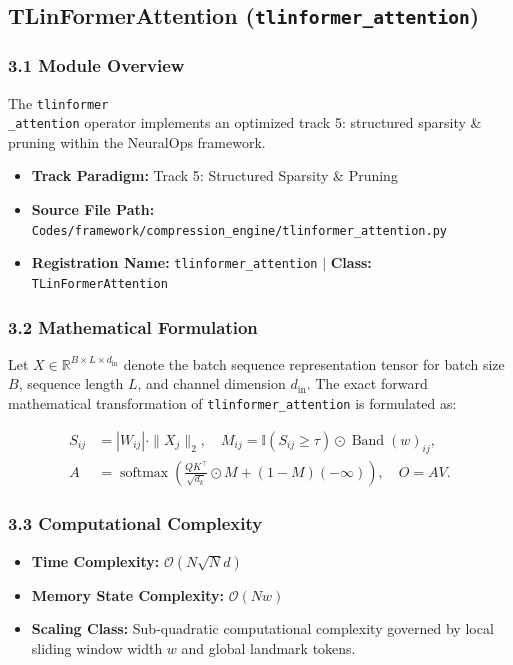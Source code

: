 \subsection{TLinFormerAttention (\texttt{tlinformer\_attention})}
\label{sec:app_module_tlinformer_attention}

\subsubsection*{3.1 Module Overview}
The \texttt{tlinformer\\_attention} operator implements an optimized track 5: structured sparsity \& pruning within the NeuralOps framework.
\begin{itemize}
    \item \textbf{Track Paradigm:} Track 5: Structured Sparsity & Pruning
    \item \textbf{Source File Path:} \texttt{Codes/framework/compression\_engine/tlinformer\_attention.py}
    \item \textbf{Registration Name:} \texttt{tlinformer\_attention} $\mid$ \textbf{Class:} \texttt{TLinFormerAttention}
\end{itemize}

\subsubsection*{3.2 Mathematical Formulation}
Let $X \in \mathbb{R}^{B \times L \times d_{\text{in}}}$ denote the batch sequence representation tensor for batch size $B$, sequence length $L$, and channel dimension $d_{\text{in}}$. The exact forward mathematical transformation of \texttt{tlinformer\_attention} is formulated as:

\begin{align}
S_{ij} &= |W_{ij}| \cdot \|X_j\|_2, \quad M_{ij} = \mathbb{I}(S_{ij} \ge \tau) \odot \operatorname{Band}(w)_{ij}, \\
A &= \operatorname{softmax}\left(\frac{Q K^\top}{\sqrt{d_k}} \odot M + (1 - M)(-\infty)\right), \quad O = A V.
\end{align}


\subsubsection*{3.3 Computational Complexity}
\begin{itemize}
    \item \textbf{Time Complexity:} $\mathcal{O}(N \sqrt{N} d)$
    \item \textbf{Memory State Complexity:} $\mathcal{O}(N w)$
    \item \textbf{Scaling Class:} Sub-quadratic computational complexity governed by local sliding window width $w$ and global landmark tokens.
\end{itemize}

